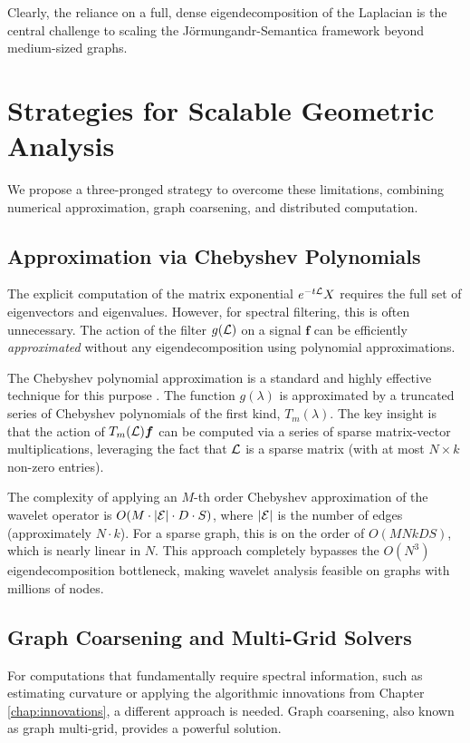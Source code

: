 Clearly, the reliance on a full, dense eigendecomposition of the Laplacian is the central challenge to scaling the Jörmungandr-Semantica framework beyond medium-sized graphs.

\section{Strategies for Scalable Geometric Analysis}
We propose a three-pronged strategy to overcome these limitations, combining numerical approximation, graph coarsening, and distributed computation.

\subsection{Approximation via Chebyshev Polynomials}
The explicit computation of the matrix exponential $e^{-t\mathcal{L}}X$ requires the full set of eigenvectors and eigenvalues. However, for spectral filtering, this is often unnecessary. The action of the filter $g(\mathcal{L})$ on a signal $\bm{f}$ can be efficiently \textit{approximated} without any eigendecomposition using polynomial approximations.

The Chebyshev polynomial approximation is a standard and highly effective technique for this purpose \citep{hammond2011wavelets}. The function $g(\lambda)$ is approximated by a truncated series of Chebyshev polynomials of the first kind, $T_m(\lambda)$. The key insight is that the action of $T_m(\mathcal{L})\bm{f}$ can be computed via a series of sparse matrix-vector multiplications, leveraging the fact that $\mathcal{L}$ is a sparse matrix (with at most $N \times k$ non-zero entries).

The complexity of applying an $M$-th order Chebyshev approximation of the wavelet operator is $O(M \cdot |\mathcal{E}| \cdot D \cdot S)$, where $|\mathcal{E}|$ is the number of edges (approximately $N \cdot k$). For a sparse graph, this is on the order of $O(M N k D S)$, which is nearly linear in $N$. This approach completely bypasses the $O(N^3)$ eigendecomposition bottleneck, making wavelet analysis feasible on graphs with millions of nodes.

\subsection{Graph Coarsening and Multi-Grid Solvers}
For computations that fundamentally require spectral information, such as estimating curvature or applying the algorithmic innovations from Chapter \ref{chap:innovations}, a different approach is needed. Graph coarsening, also known as graph multi-grid, provides a powerful solution.

